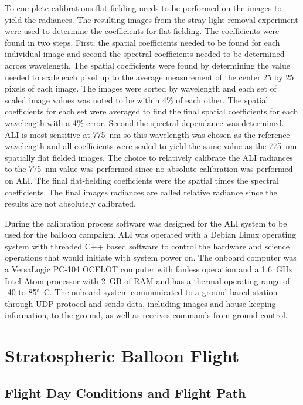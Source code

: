 \documentclass[12pt]{article}
\begin{document}
To complete calibrations flat-fielding needs to be performed on the images to yield the radiances. The resulting images from the stray light removal experiment were used to 
determine the coefficients for flat fielding. The coefficients were found in two steps. First, the spatial coefficients needed to be found for each individual image and second 
the spectral coefficients needed to be determined across wavelength. The spatial coefficients were found by determining the value needed to scale each pixel up to the average 
measurement of the center 25 by 25 pixels of each image. The images were sorted by wavelength and each set of scaled image values was noted to be within 4\% of each other. The 
spatial coefficients for each set were averaged to find the final spatial coefficients for each wavelength with a 4\% error. Second the spectral dependance was determined. ALI 
is most sensitive at 775~nm so this wavelength was chosen as the reference wavelength and all coefficients were scaled to yield the same value as the 775~nm spatially flat 
fielded images. The choice to relatively calibrate the ALI radiances to the 775~nm value was performed since no absolute calibration was performed on ALI. The final 
flat-fielding coefficients were the spatial times the spectral coefficients. The final images radiances are called relative radiance since the results are not absolutely 
calibrated.

During the calibration process software was designed for the ALI system to be used for the balloon campaign. ALI was operated with a Debian Linux operating system with threaded 
C++ based software to control the hardware and science operations that would initiate with system power on. The onboard computer was a VersaLogic PC-104 OCELOT computer with 
fanless operation and a 1.6~GHz Intel Atom processor with 2~GB of RAM and has a thermal operating range of -40 to 85\si{\degree C}. The onboard system communicated to a ground 
based station through UDP protocol and sends data, including images and house keeping information, to the ground, as well as receives commands from ground control.

\section{Stratospheric Balloon Flight}

\subsection{Flight Day Conditions and Flight Path}
\end{document}
